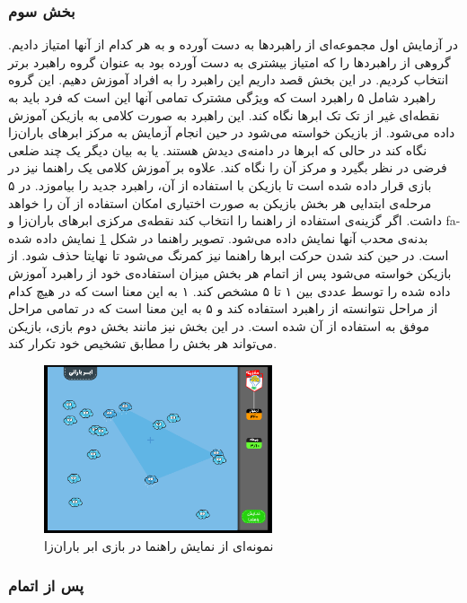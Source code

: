 \documentclass[twoside, a4paper,11pt]{book}
\numberwithin{equation}{chapter}
\numberwithin{table}{chapter}
\numberwithin{figure}{chapter}
\numberwithin{equation}{chapter}
\newcommand{\mls}[1]{\gls{fa-#1}\glsuseri{la-#1}}
\begin{document}
\subsubsection{بخش سوم} \label{partTwoMainTest:three}
در آزمایش اول مجموعه‌ای از راهبردها به دست آورده و به هر کدام از آنها امتیاز دادیم. گروهی از راهبردها را که امتیاز بیشتری به دست آورده بود به عنوان گروه راهبرد برتر انتخاب کردیم. در این بخش قصد داریم این راهبرد را به افراد آموزش دهیم. این گروه راهبرد شامل ۵ راهبرد است که ویژگی مشترک تمامی آنها این است که فرد باید به نقطه‌ای غیر از تک تک ابرها نگاه کند. این راهبرد به صورت کلامی به بازیکن آموزش داده می‌شود. از بازیکن خواسته می‌شود در حین انجام آزمایش به مرکز ابرهای باران‌زا نگاه کند در حالی که ابرها در دامنه‌ی دیدش هستند. یا به بیان دیگر یک چند ضلعی فرضی در نظر بگیرد و مرکز آن را نگاه کند. علاوه بر آموزش کلامی یک راهنما نیز در بازی قرار داده شده است تا بازیکن با استفاده از آن، راهبرد جدید را بیاموزد. در ۵ مرحله‌ی ابتدایی هر بخش بازیکن به صورت اختیاری امکان استفاده از آن را خواهد داشت. اگر گزینه‌ی استفاده از راهنما را انتخاب کند نقطه‌ی مرکزی ابرهای باران‌زا و \mls{بدنه‌ی محدب} آنها نمایش داده می‌شود. تصویر راهنما در شکل \ref{fig:cloudsWithGuide3} نمایش داده شده است. در حین کند شدن حرکت ابرها راهنما نیز کمرنگ می‌شود تا نهایتا حذف شود. از بازیکن خواسته می‌شود پس از اتمام هر بخش میزان استفاده‌ی خود از راهبرد آموزش داده شده را توسط عددی بین ۱ تا ۵ مشخص کند. ۱ به این معنا است که در هیچ کدام از مراحل نتوانسته از راهبرد استفاده کند و ۵ به این معنا است که در تمامی مراحل موفق به استفاده از آن شده است. در این بخش نیز مانند بخش دوم بازی، بازیکن می‌تواند هر بخش را مطابق تشخیص خود تکرار کند.

\begin{figure}
\centering
\includegraphics[width=0.6\textwidth, center]{Figures/cloudsWithGuide3.png}
\caption{\label{fig:cloudsWithGuide3}
نمونه‌ای از نمایش راهنما در بازی ابر باران‌زا
}
\end{figure}

\subsubsection{پس از اتمام}
\end{document}
